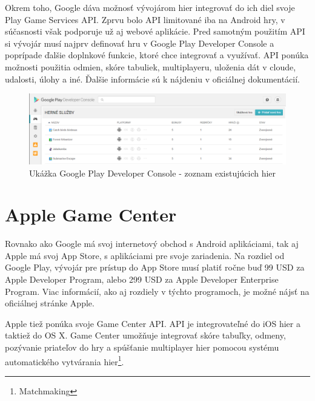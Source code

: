 Okrem toho, Google dáva možnosť vývojárom hier integrovať do ich diel svoje Play Game Services API. Zprvu bolo API limitované iba na Android hry, v súčasnosti však podporuje už aj webové aplikácie. Pred samotným použitím API si vývojár musí najprv definovať hru v Google Play Developer Console a poprípade ďalšie doplnkové funkcie, ktoré chce integrovať a využívať. API ponúka možnosti použitia odmien, skóre tabuliek, multiplayeru, uloženia dát v cloude, udalosti, úlohy a iné. Ďalšie informácie sú k nájdeniu v oficiálnej dokumentácií. \cite{google-developers}  
\begin{figure}[h]
  \centering
  \includegraphics[scale=0.32]{fig/google-play.png}
  \caption{Ukážka Google Play Developer Console  - zoznam existujúcich hier}
  \label{fig:google-play}
\end{figure}

\section{Apple Game Center}
Rovnako ako Google má svoj internetový obchod s Android aplikáciami, tak aj Apple má svoj App Store, s aplikáciami pre svoje zariadenia. Na rozdiel od Google Play, vývojár pre prístup do App Store musí platiť ročne buď 99 USD za Apple Developer Program, alebo 299 USD za Apple Developer Enterprise Program. Viac informácií, ako aj rozdiely v týchto programoch, je možné nájsť na oficiálnej stránke Apple.  

Apple tiež ponúka svoje Game Center API. API je integrovateľné do iOS hier a taktiež do OS X. Game Center umožňuje integrovať skóre tabuľky, odmeny, pozývanie priateľov do hry a spúšťanie multiplayer hier pomocou systému automatického vytvárania hier\footnote{Matchmaking}. \cite{apple-developer}

